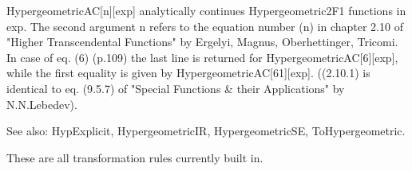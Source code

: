 




HypergeometricAC[n][exp] analytically continues Hypergeometric2F1 functions in exp. The second argument n refers to the equation number
  (n) in chapter 2.10 of "Higher Transcendental Functions" by Ergelyi, Magnus, Oberhettinger, Tricomi. In case of eq. (6) (p.109) the
  last line is returned for HypergeometricAC[6][exp], while the first equality is given by HypergeometricAC[61][exp]. ((2.10.1) is
  identical to eq. (9.5.7) of "Special Functions \&{} their Applications" by N.N.Lebedev).



See also:  HypExplicit, HypergeometricIR, HypergeometricSE, ToHypergeometric.


These are all transformation rules currently built in.






